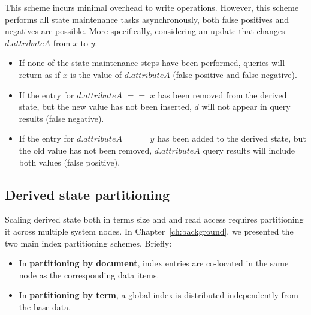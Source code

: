 This scheme incurs minimal overhead to write operations.
However, this scheme performs all state maintenance tasks asynchronously,
both false positives and negatives are possible.
More specifically, considering an update that changes $d.attributeA$ from $x$ to $y$:
\begin{itemize}
  \item If none of the state maintenance steps have been performed, queries will return as if $x$ is the value of $d.attributeA$
  (false positive and false negative).

  \item If the entry for $d.attributeA$ $==$ $x$ has been removed from the derived state, but the new value has not been
  inserted, $d$ will not appear in query results (false negative).

  \item If the entry for $d.attributeA$ $==$ $y$ has been added to the derived state, but the old value has not been
  removed, $d.attributeA$ query results will include both values (false positive).
\end{itemize}


\subsection{Derived state partitioning}
\label{sec:index_partitioning_design_space}


Scaling derived state both in terms size and and read access requires partitioning it across multiple system nodes.
In Chapter~\ref{ch:background}, we presented the two main index partitioning schemes.
Briefly:

\begin{itemize}
  \item In \textbf{partitioning by document}, index entries are co-located in the same node as the corresponding
  data items.
  \item In \textbf{partitioning by term}, a global index is distributed independently from the base data.
\end{itemize}

